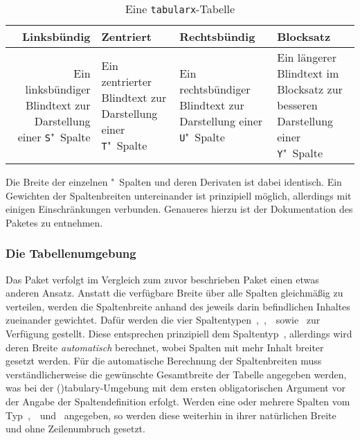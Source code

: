 \documentclass[%
  english,ngerman,%
  cdgeometry=no,DIV=12,%
  cd=false,cdfont=false,cdtitle=true,%
  headings=normal,%
  automark,%
  listof=toc,%
]{tudscrartcl}
\begin{document}
\begin{Trunk}
\begin{table}
\begin{tabularx}{\textwidth}{@{}DEFY@{}}
\toprule
\textbf{Linksbündig} & \textbf{Zentriert} & 
\textbf{Rechtsbündig} & \textbf{Blocksatz} \tabularnewline
\midrule
Ein linksbündiger Blindtext 
  zur Darstellung einer \texttt{S}"~Spalte &
Ein zentrierter Blindtext 
  zur Darstellung einer \texttt{T}"~Spalte &
Ein rechtsbündiger Blindtext 
  zur Darstellung einer \texttt{U}"~Spalte &
Ein längerer Blindtext im Blocksatz 
  zur besseren Darstellung einer \texttt{Y}"~Spalte
\tabularnewline\bottomrule
\end{tabularx}
\caption{Eine \texttt{tabularx}-Tabelle\label{tab:tabularx}}
\end{table}

\end{Trunk}
\InputCode\noindent
%
Die Breite der einzelnen "~Spalten und deren Derivaten ist dabei 
identisch. Ein Gewichten der Spaltenbreiten untereinander ist prinzipiell 
möglich, allerdings mit einigen Einschränkungen verbunden. Genaueres hierzu ist 
der Dokumentation des Paketes  zu entnehmen.



\subsubsection{%
  Die Tabellenumgebung %
  \label{sec:tabulary}%
}

Das Paket  verfolgt im Vergleich zum zuvor beschrieben Paket 
 einen etwas anderen Ansatz. Anstatt die verfügbare Breite 
über alle Spalten gleichmäßig zu verteilen, werden die Spaltenbreite anhand des 
jeweils darin befindlichen Inhaltes zueinander gewichtet. Dafür werden die vier 
Spaltentypen~,~,~~sowie~ zur Verfügung 
gestellt. Diese entsprechen prinzipiell dem Spaltentyp~, allerdings 
wird deren Breite \emph{automatisch} berechnet, wobei Spalten mit mehr Inhalt 
breiter gesetzt werden. Für die automatische Berechnung der Spaltenbreiten muss 
verständlicherweise die gewünschte Gesamtbreite der Tabelle angegeben werden, 
was bei der \Environment(){tabulary}-Umgebung mit dem ersten 
obligatorischen Argument vor der Angabe der Spaltendefinition erfolgt. Werden 
eine oder mehrere Spalten vom Typ~,~~und~ 
angegeben, so werden diese weiterhin in ihrer natürlichen Breite und ohne 
Zeilenumbruch gesetzt. 
\end{document}
